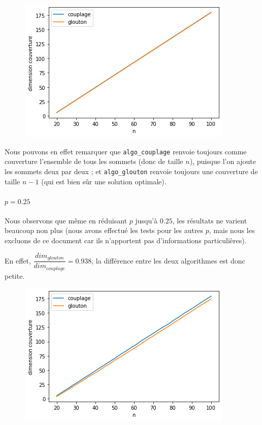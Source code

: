 \documentclass[12pt]{article}
\begin{document}
\begin{enumerate}

                    \begin{figure}[h]
                        \includegraphics[scale=0.5]{figures/qualite_1.png}
                        \centering
                    \end{figure}

                    Nous pouvons en effet remarquer que \texttt{algo\_couplage} renvoie toujours comme couverture l'ensemble de tous les sommets (donc de taille $n$), puisque l'on ajoute les sommets deux par deux ; et \texttt{algo\_glouton} renvoie toujours une couverture de taille $n-1$ (qui est bien sûr une solution optimale).

                \paragraph{$p = 0.25$}
                    Nous observons que même en réduisant $p$ jusqu'à $0.25$, les résultats ne varient beaucoup non plus (nous avons effectué les tests pour les autres $p$, mais nous les excluons de ce document car ils n'apportent pas d'informations particulières).
                    
                    En effet, $\dfrac{dim_{glouton}}{dim_{couplage}} = 0.938 $, la différence entre les deux algorithmes est donc petite.
                    
                    \begin{figure}[H]
                        \includegraphics[scale=0.5]{figures/qualite_025.png}
                        \centering
                    \end{figure}
                

\end{enumerate}
\end{document}
